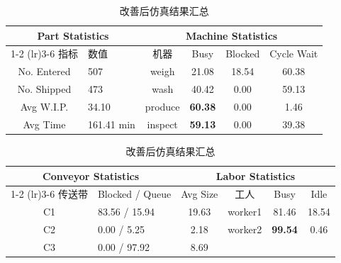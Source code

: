 \documentclass[12pt, a4paper, UTF8]{ctexart}
\begin{document}
\begin{table}[H]
    \centering
    \caption{改善后仿真结果汇总}
    \label{tab:after_all}
    \small
    \begin{tabular}{clcccc}
        \toprule
        \multicolumn{2}{c}{\textbf{Part Statistics}} & \multicolumn{4}{c}{\textbf{Machine Statistics}} \\
        \cmidrule(lr){1-2} \cmidrule(lr){3-6}
        指标 & 数值 & 机器 & Busy & Blocked & Cycle Wait \\
        \midrule
        No. Entered & 507 & weigh & 21.08 & 18.54 & 60.38 \\
        No. Shipped & 473 & wash & 40.42 & 0.00 & 59.13 \\
        Avg W.I.P. & 34.10 & produce & \textbf{60.38} & 0.00 & 1.46 \\
        Avg Time & 161.41 min & inspect & \textbf{59.13} & 0.00 & 39.38 \\
        \bottomrule
    \end{tabular}

    \vspace{6pt}
    \small
    \begin{tabular}{clcccc}
        \toprule
        \multicolumn{2}{c}{\textbf{Conveyor Statistics}} & \multicolumn{4}{c}{\textbf{Labor Statistics}} \\
        \cmidrule(lr){1-2} \cmidrule(lr){3-6}
        传送带 & Blocked / Queue & Avg Size & 工人 & Busy & Idle \\
        \midrule
        C1 & 83.56 / 15.94 & 19.63 & worker1 & 81.46 & 18.54 \\
        C2 & 0.00 / 5.25 & 2.18 & worker2 & \textbf{99.54} & 0.46 \\
        C3 & 0.00 / 97.92 & 8.69 & & & \\
        \bottomrule
    \end{tabular}
\end{table}
\end{document}
